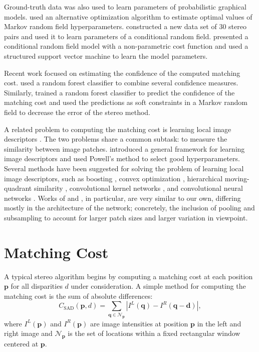 \documentclass[twoside,11pt]{article}
\begin{document}
Ground-truth data was also used to learn parameters of probabilistic graphical
models. \citet{zhang2007estimating} used an alternative optimization algorithm
to estimate optimal values of Markov random field hyperparameters.
\citet{scharstein2007learning} constructed a new data set of 30 stereo pairs and
used it to learn parameters of a conditional random field.
\citet{li2008learning} presented a conditional random field model with a
non-parametric cost function and used a structured support vector machine to
learn the model parameters.

Recent work \citep{haeusler2013ensemble,spyropoulos2014learning} focused on
estimating the confidence of the computed matching cost.
\citet{haeusler2013ensemble} used a
random forest classifier to combine several confidence measures. Similarly,
\citet{spyropoulos2014learning} trained a random forest classifier to predict
the confidence of the matching cost and used the predictions as soft constraints
in a Markov random field to decrease the error of the stereo method.


A related problem to computing the matching cost is learning local image
descriptors \citep{brown2011discriminative, trzcinski2012learning,
simonyan2014learning, revaud2015deepmatching, paulin2015local, han2015matchnet,
zagoruyko2015learning}. The two problems share a common subtask: to measure the
similarity between image patches.  \citet{brown2011discriminative} introduced a
general framework for learning image descriptors and used Powell's method to
select good hyperparameters.  Several methods have been suggested for solving
the problem of learning local image descriptors, such as 
boosting \citep{trzcinski2012learning}, 
convex optimization \citep{simonyan2014learning}, 
hierarchical moving-quadrant similarity \citep{revaud2015deepmatching},
convolutional kernel networks \citep{paulin2015local}, 
and convolutional neural networks \citep{zagoruyko2015learning,han2015matchnet}. 
Works of \citet{zagoruyko2015learning} and \citet{han2015matchnet}, in
particular, are very similar to our own, differing mostly in the architecture of
the network; concretely, the inclusion of pooling and subsampling to account
for larger patch sizes and larger variation in viewpoint.

\section{Matching Cost}

A typical stereo algorithm begins by computing a matching cost at each
position $\mathbf{p}$ for all disparities $d$ under consideration. A
simple method for computing the matching cost is the sum of absolute
differences:
%
\begin{equation} C_{\text{SAD}}(\mathbf{p}, d) = \sum_{\mathbf{q} \in
\mathcal{N}_{\mathbf{p}}} |I^L(\mathbf{q}) - I^R(\mathbf{q}-\mathbf{d})|,
\label{eqn:C_sad}
\end{equation}
%
where $I^L(\mathbf{p})$ and $I^R(\mathbf{p})$ are image intensities at position
$\mathbf{p}$ in the left and right image and $\mathcal{N}_{\mathbf{p}}$ is the
set of locations within a fixed rectangular window centered at $\mathbf{p}$. 
\end{document}
